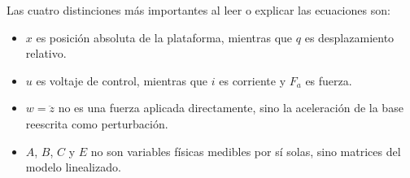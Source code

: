 \documentclass[11pt]{article}
\begin{document}
Las cuatro distinciones m\'as importantes al leer o explicar las ecuaciones son:

\begin{itemize}[leftmargin=1.2cm]
\item $x$ es posici\'on absoluta de la plataforma, mientras que $q$ es desplazamiento relativo.
\item $u$ es voltaje de control, mientras que $i$ es corriente y $F_a$ es fuerza.
\item $w=\ddot z$ no es una fuerza aplicada directamente, sino la aceleraci\'on de la base reescrita como perturbaci\'on.
\item $A$, $B$, $C$ y $E$ no son variables f\'isicas medibles por s\'i solas, sino matrices del modelo linealizado.
\end{itemize}
\end{document}
